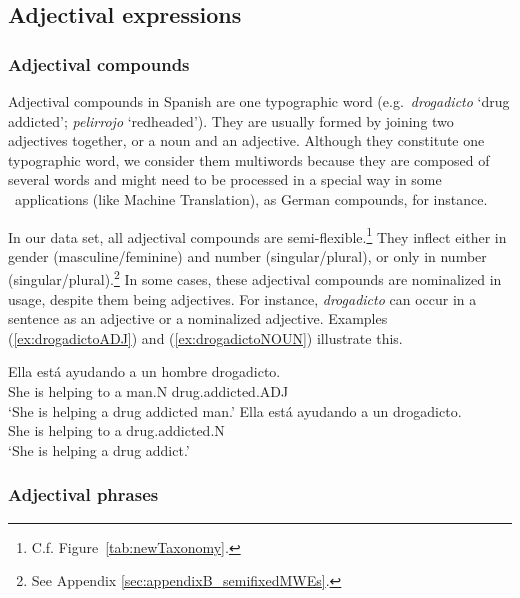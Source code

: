 \documentclass[output=paper]{langsci/langscibook}
\begin{document}

\subsection{Adjectival expressions}
\label{sssec:adjectivalExps}

\subsubsection{Adjectival compounds}

Adjectival compounds in Spanish are one typographic word (e.g.\ \textit{drogadicto} `drug addicted'; \textit{pelirrojo} `redheaded').
They are usually formed by joining two adjectives together, or a noun and an adjective.
Although they constitute one typographic word, we consider them multiwords because they are composed of several words and might need to be processed in a special way in some \nlp\ applications (like Machine Translation), as German compounds, for instance.

In our data set, all adjectival compounds are semi-flexible.\footnote{C.f.\@ 
Figure~\ref{tab:newTaxonomy}.}
They inflect either in gender (masculine/feminine) and number (singular/plural), or only in number (singular/plural).\footnote{See Appendix \ref{sec:appendixB_semifixedMWEs}.}
In some cases, these adjectival compounds are nominalized in usage, despite them being adjectives.
For instance, \textit{drogadicto} can occur in a sentence as an adjective or a nominalized adjective.
Examples (\ref{ex:drogadictoADJ}) and (\ref{ex:drogadictoNOUN}) illustrate this.

\begin{exe}
\ex \label{ex:drogadictoADJ}
\gll Ella está ayudando a un hombre drogadicto. \\
She is helping to a man.N {drug.addicted.ADJ} \\
\glt `She is helping a drug addicted man.'
\ex \label{ex:drogadictoNOUN}
\gll Ella está ayudando a un drogadicto. \\
She is helping to a {drug.addicted.N} \\
\glt `She is helping a drug addict.'
\end{exe}

\subsubsection{Adjectival phrases}
\end{document}
